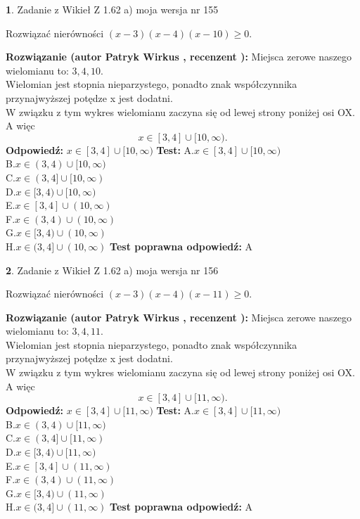 \documentclass[12pt, a4paper]{article}
\theoremstyle{definition} %
\newtheorem{zad}{}
\newcommand{\zadStart}[1]{\begin{zad}#1\newline}
\newcommand{\zadStop}{\end{zad}}
\newcommand{\rozwStart}[2]{\noindent \textbf{Rozwiązanie (autor #1 , recenzent #2): }\newline}
\newcommand{\rozwStop}{\newline}
\newcommand{\odpStart}{\noindent \textbf{Odpowiedź:}\newline}
\newcommand{\odpStop}{\newline}
\newcommand{\testStart}{\noindent \textbf{Test:}\newline}
\newcommand{\testStop}{\newline}
\newcommand{\kluczStart}{\noindent \textbf{Test poprawna odpowiedź:}\newline}
\newcommand{\kluczStop}{\newline}
\begin{document}
\zadStart{Zadanie z Wikieł Z 1.62 a) moja wersja nr 155}

Rozwiązać nierówności $(x-3)(x-4)(x-10)\ge0$.
\zadStop
\rozwStart{Patryk Wirkus}{}
Miejsca zerowe naszego wielomianu to: $3, 4, 10$.\\
Wielomian jest stopnia nieparzystego, ponadto znak współczynnika przy\linebreak najwyższej potędze x jest dodatni.\\ W związku z tym wykres wielomianu zaczyna się od lewej strony poniżej osi OX. A więc $$x \in [3,4] \cup [10,\infty).$$
\rozwStop
\odpStart
$x \in [3,4] \cup [10,\infty)$
\odpStop
\testStart
A.$x \in [3,4] \cup [10,\infty)$\\
B.$x \in (3,4) \cup [10,\infty)$\\
C.$x \in (3,4] \cup [10,\infty)$\\
D.$x \in [3,4) \cup [10,\infty)$\\
E.$x \in [3,4] \cup (10,\infty)$\\
F.$x \in (3,4) \cup (10,\infty)$\\
G.$x \in [3,4) \cup (10,\infty)$\\
H.$x \in (3,4] \cup (10,\infty)$
\testStop
\kluczStart
A
\kluczStop



\zadStart{Zadanie z Wikieł Z 1.62 a) moja wersja nr 156}

Rozwiązać nierówności $(x-3)(x-4)(x-11)\ge0$.
\zadStop
\rozwStart{Patryk Wirkus}{}
Miejsca zerowe naszego wielomianu to: $3, 4, 11$.\\
Wielomian jest stopnia nieparzystego, ponadto znak współczynnika przy\linebreak najwyższej potędze x jest dodatni.\\ W związku z tym wykres wielomianu zaczyna się od lewej strony poniżej osi OX. A więc $$x \in [3,4] \cup [11,\infty).$$
\rozwStop
\odpStart
$x \in [3,4] \cup [11,\infty)$
\odpStop
\testStart
A.$x \in [3,4] \cup [11,\infty)$\\
B.$x \in (3,4) \cup [11,\infty)$\\
C.$x \in (3,4] \cup [11,\infty)$\\
D.$x \in [3,4) \cup [11,\infty)$\\
E.$x \in [3,4] \cup (11,\infty)$\\
F.$x \in (3,4) \cup (11,\infty)$\\
G.$x \in [3,4) \cup (11,\infty)$\\
H.$x \in (3,4] \cup (11,\infty)$
\testStop
\kluczStart
A
\kluczStop
\end{document}
